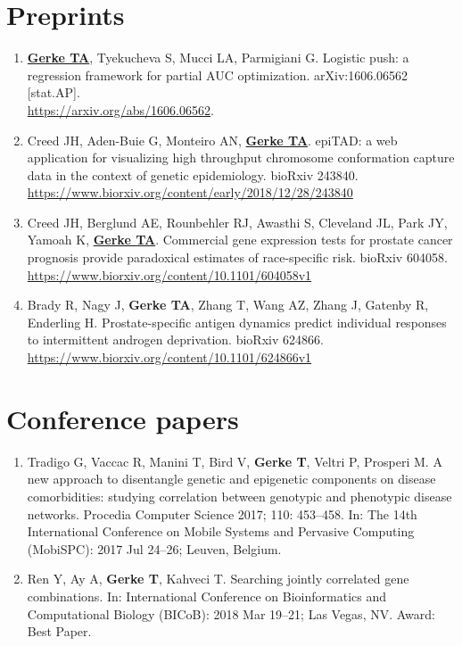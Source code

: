 \documentclass[11pt, a4paper]{article} %
\begin{document}
\section*{Preprints}
\begin{enumerate}[leftmargin=*]
\item{} \underline{{\bf Gerke TA}}, Tyekucheva S, Mucci LA, Parmigiani G. Logistic push: a regression framework for partial AUC optimization. arXiv:1606.06562 [stat.AP].\\\href{https://arxiv.org/abs/1606.06562}{https://arxiv.org/abs/1606.06562}.

\item{} Creed JH, Aden-Buie G, Monteiro AN, \underline{{\bf Gerke TA}}. epiTAD: a web application for visualizing high throughput chromosome conformation capture data in the context of genetic epidemiology. bioRxiv 243840. \\\href{https://www.biorxiv.org/content/early/2018/12/28/243840}{https://www.biorxiv.org/content/early/2018/12/28/243840}

\item{} Creed JH, Berglund AE, Rounbehler RJ, Awasthi S, Cleveland JL, Park JY, Yamoah K, \underline{{\bf Gerke TA}}. Commercial gene expression tests for prostate cancer prognosis provide paradoxical estimates of race-specific risk. bioRxiv 604058. \\\href{https://www.biorxiv.org/content/10.1101/604058v1}{https://www.biorxiv.org/content/10.1101/604058v1}

\item{} Brady R, Nagy J, {\bf Gerke TA}, Zhang T, Wang AZ, Zhang J, Gatenby R, Enderling H. Prostate-specific antigen dynamics predict individual responses to intermittent androgen deprivation. bioRxiv 624866. \href{https://www.biorxiv.org/content/10.1101/624866v1}{https://www.biorxiv.org/content/10.1101/624866v1}
\end{enumerate}

\section*{Conference papers}
\begin{enumerate}[leftmargin=*]
\item{} Tradigo G, Vaccac R, Manini T, Bird V, {\bf Gerke T}, Veltri P, Prosperi M. A new approach to disentangle genetic and epigenetic components on disease comorbidities: studying correlation between genotypic and phenotypic disease networks. Procedia Computer Science 2017; 110: 453--458. In: The 14th International Conference on Mobile Systems and Pervasive Computing (MobiSPC): 2017 Jul 24--26; Leuven, Belgium.

\item{} Ren Y, Ay A, {\bf Gerke T}, Kahveci T. Searching jointly correlated gene combinations. In: International Conference on Bioinformatics and Computational Biology (BICoB): 2018 Mar 19--21; Las Vegas, NV. Award: Best Paper. 
\end{enumerate}
\end{document}
